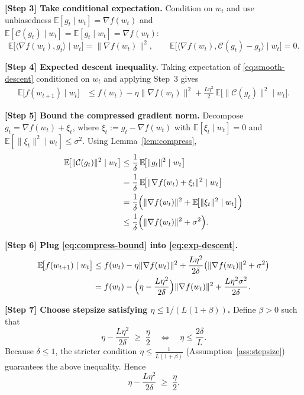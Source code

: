 \documentclass{article}
\newcommand{\E}{\mathbb{E}}
\newcommand{\C}{\mathcal{C}}
\begin{document}
\noindent\textbf{[Step 3] Take conditional expectation.}  
Condition on $w_t$ and use unbiasedness $\E[g_t\mid w_t]=\nabla f(w_t)$ and $\E[\C(g_t)\mid w_t]=\E[g_t\mid w_t]=\nabla f(w_t)$:
\[
\E\bigl[\langle\nabla f(w_t),g_t\rangle\mid w_t\bigr]
=\|\nabla f(w_t)\|^{2},
\qquad
\E\bigl[\langle\nabla f(w_t),\C(g_t)-g_t\rangle\mid w_t\bigr]=0.
\]

\noindent\textbf{[Step 4] Expected descent inequality.}  
Taking expectation of \eqref{eq:smooth-descent} conditioned on $w_t$ and applying Step~3 gives
\begin{align}
\E\!\bigl[f(w_{t+1})\mid w_t\bigr]
&\le f(w_t)-\eta\|\nabla f(w_t)\|^{2}
+\frac{L\eta^{2}}{2}\,\E\!\bigl[\|\C(g_t)\|^{2}\mid w_t\bigr]. \label{eq:exp-descent}
\end{align}

\noindent\textbf{[Step 5] Bound the compressed gradient norm.}  
Decompose $g_t=\nabla f(w_t)+\xi_t$, where $\xi_t:=g_t-\nabla f(w_t)$ with $\E[\xi_t\mid w_t]=0$ and $\E[\|\xi_t\|^{2}\mid w_t]\le\sigma^{2}$.
Using Lemma~\ref{lem:compress},
\begin{align}
\E\!\bigl[\|\C(g_t)\|^{2}\mid w_t\bigr]
&\le\frac{1}{\delta}\,\E\!\bigl[\|g_t\|^{2}\mid w_t\bigr] \nonumber\\
&=\frac{1}{\delta}\,\E\!\bigl[\|\nabla f(w_t)+\xi_t\|^{2}\mid w_t\bigr] \nonumber\\
&=\frac{1}{\delta}\Bigl(\|\nabla f(w_t)\|^{2}
+\E\!\bigl[\|\xi_t\|^{2}\mid w_t\bigr]\Bigr) \nonumber\\
&\le\frac{1}{\delta}\Bigl(\|\nabla f(w_t)\|^{2}+\sigma^{2}\Bigr). \label{eq:compress-bound}
\end{align}

\noindent\textbf{[Step 6] Plug \eqref{eq:compress-bound} into \eqref{eq:exp-descent}.}
\begin{align}
\E\!\bigl[f(w_{t+1})\mid w_t\bigr]
&\le f(w_t)-\eta\|\nabla f(w_t)\|^{2}
+\frac{L\eta^{2}}{2\delta}\bigl(\|\nabla f(w_t)\|^{2}+\sigma^{2}\bigr) \nonumber\\
&= f(w_t)-\Bigl(\eta-\frac{L\eta^{2}}{2\delta}\Bigr)\|\nabla f(w_t)\|^{2}
+\frac{L\eta^{2}\sigma^{2}}{2\delta}. \label{eq:descent-intermediate}
\end{align}

\noindent\textbf{[Step 7] Choose stepsize satisfying $\eta\le 1/(L(1+\beta))$.}  
Define $\beta>0$ such that
\[
\eta-\frac{L\eta^{2}}{2\delta}
\;\ge\;
\frac{\eta}{2}\quad\Longleftrightarrow\quad
\eta\le\frac{2\delta}{L}.
\]
Because $\delta\le1$, the stricter condition $\eta\le\frac{1}{L(1+\beta)}$ (Assumption~\ref{ass:stepsize}) guarantees the above inequality. Hence
\[
\eta-\frac{L\eta^{2}}{2\delta}\;\ge\;\frac{\eta}{2}. \label{eq:eta-lower}
\]
\end{document}
